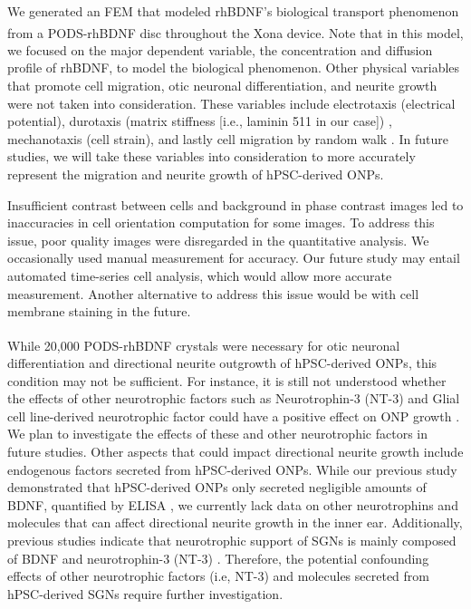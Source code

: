 \documentclass[review]{elsarticle}
\begin{document}
\indent We generated an FEM that modeled rhBDNF's biological transport phenomenon from a PODS\textsuperscript{\textregistered}-rhBDNF disc throughout the Xona\textsuperscript{\texttrademark} device. Note that in this model, we focused on the major dependent variable, the concentration and diffusion profile of rhBDNF, to model the biological phenomenon. Other physical variables that promote cell migration, otic neuronal differentiation, and neurite growth were not taken into consideration. These variables include electrotaxis (electrical potential), durotaxis (matrix stiffness [i.e., laminin 511 in our case]) \cite{Gentile2016}, mechanotaxis (cell strain), and lastly cell migration by random walk \cite{berg1983}. In future studies, we will take these variables into consideration to more accurately represent the migration and neurite growth of hPSC-derived ONPs. 

\indent Insufficient contrast between cells and background in phase contrast images led to inaccuracies in cell orientation computation for some images. To address this issue, poor quality images were disregarded in the quantitative analysis. We occasionally used manual measurement for accuracy. Our future study may entail automated time-series cell analysis, which would allow more accurate measurement. Another alternative to address this issue would be with cell membrane staining in the future. 

\indent While 20,000 PODS\textsuperscript{\textregistered}-rhBDNF crystals were necessary for otic neuronal differentiation and directional neurite outgrowth of hPSC-derived ONPs, this condition may not be sufficient. For instance, it is still not understood whether the effects of other neurotrophic factors such as Neurotrophin-3 (NT-3) and Glial cell line-derived neurotrophic factor could have a positive effect on ONP growth \cite{green2012, li2017, Schulze2020}. We plan to investigate the effects of these and other neurotrophic factors in future studies. Other aspects that could impact directional neurite growth include endogenous factors secreted from hPSC-derived ONPs. While our previous study demonstrated that hPSC-derived ONPs only secreted negligible amounts of BDNF, quantified by ELISA \cite{Chang2020}, we currently lack data on other neurotrophins and molecules that can affect directional neurite growth in the inner ear. Additionally, previous studies indicate that neurotrophic support of SGNs is mainly composed of BDNF and neurotrophin-3 (NT-3) \cite{green2012,Sasi2017}. Therefore, the potential confounding effects of other neurotrophic factors (i.e, NT-3) and molecules secreted from hPSC-derived SGNs require further investigation.  
\end{document}
